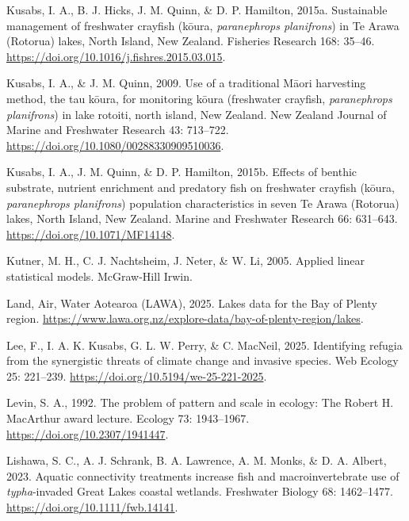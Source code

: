\documentclass[
  letterpaper,
  DIV=11,
  numbers=noendperiod]{scrartcl}
\newlength{\cslhangindent}
\newenvironment{CSLReferences}[2] %
 {\begin{list}{}{%
  \setlength{\itemindent}{0pt}
  \setlength{\leftmargin}{0pt}
  \setlength{\parsep}{0pt}
  \ifodd #1
   \setlength{\leftmargin}{\cslhangindent}
   \setlength{\itemindent}{-1\cslhangindent}
  \fi
  \setlength{\itemsep}{#2\baselineskip}}}
 {\end{list}}
\begin{document}
\begin{CSLReferences}{0}{1}
Kusabs, I. A., B. J. Hicks, J. M. Quinn, \& D. P. Hamilton, 2015a.
Sustainable management of freshwater crayfish (k{ō}ura,
\emph{paranephrops planifrons}) in {Te Arawa} ({Rotorua}) lakes, {North
Island, New Zealand}. Fisheries Research 168: 35--46.
\url{https://doi.org/10.1016/j.fishres.2015.03.015}.

Kusabs, I. A., \& J. M. Quinn, 2009. Use of a traditional {Māori}
harvesting method, the tau k{ō}ura, for monitoring k{ō}ura (freshwater
crayfish, \emph{paranephrops planifrons}) in lake rotoiti, north island,
{New Zealand}. New Zealand Journal of Marine and Freshwater Research 43:
713--722. \url{https://doi.org/10.1080/00288330909510036}.

Kusabs, I. A., J. M. Quinn, \& D. P. Hamilton, 2015b. Effects of benthic
substrate, nutrient enrichment and predatory fish on freshwater crayfish
(k{ō}ura, \emph{paranephrops planifrons}) population characteristics in
seven {Te Arawa} ({Rotorua}) lakes, {North Island, New Zealand}. Marine
and Freshwater Research 66: 631--643.
\url{https://doi.org/10.1071/MF14148}.

Kutner, M. H., C. J. Nachtsheim, J. Neter, \& W. Li, 2005. Applied
linear statistical models. McGraw-Hill Irwin.

Land, Air, Water Aotearoa (LAWA), 2025. Lakes data for the {Bay of
Plenty} region.
\url{https://www.lawa.org.nz/explore-data/bay-of-plenty-region/lakes}.

Lee, F., I. A. K. Kusabs, G. L. W. Perry, \& C. MacNeil, 2025.
Identifying refugia from the synergistic threats of climate change and
invasive species. Web Ecology 25: 221--239.
\url{https://doi.org/10.5194/we-25-221-2025}.

Levin, S. A., 1992. The problem of pattern and scale in ecology: The
{Robert H. MacArthur} award lecture. Ecology 73: 1943--1967.
\url{https://doi.org/10.2307/1941447}.

Lishawa, S. C., A. J. Schrank, B. A. Lawrence, A. M. Monks, \& D. A.
Albert, 2023. Aquatic connectivity treatments increase fish and
macroinvertebrate use of \emph{typha}-invaded {Great Lakes} coastal
wetlands. Freshwater Biology 68: 1462--1477.
\url{https://doi.org/10.1111/fwb.14141}.


\end{CSLReferences}
\end{document}
